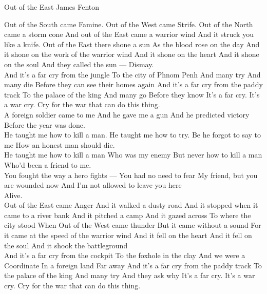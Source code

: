  \begin{poem}
{Out of the East}
{James Fenton}

 Out of the South came Famine.
 Out of the West came Strife.
 Out of the North came a storm cone
 And out of the East came a warrior wind
 And it struck you like a knife.
 Out of the East there shone a sun
 As the blood rose on the day
 And it shone on the work of the warrior wind
 And it shone on the heart
 And it shone on the soul
 And they called the sun --- Dismay.\\
 
 And it's a far cry from the jungle
 To the city of Phnom Penh
 And many try
 And many die
 Before they can see their homes again
 And it's a far cry from the paddy track
 To the palace of the king
 And many go
 Before they know
 It's a far cry.
 It's a war cry.
 Cry for the war that can do this thing.\\
 
 A foreign soldier came to me
 And he gave me a gun
 And he predicted victory
 Before the year was done.\\
 
 He taught me how to kill a man.
 He taught me how to try.
 Be he forgot to say to me
 How an honest man should die.\\
 
 He taught me how to kill a man
 Who was my enemy
 But never how to kill a man
 Who'd been a friend to me.\\
 
 You fought the way a hero fights ---
 You had no need to fear
 My friend, but you are wounded now
 And I'm not allowed to leave you here\\
 
 Alive.\\
 
 Out of the East came Anger
 And it walked a dusty road
 And it stopped when it came to a river bank
 And it pitched a camp
 And it gazed across
 To where the city stood
 When
 Out of the West came thunder
 But it came without a sound
 For it came at the speed of the warrior wind
 And it fell on the heart
 And it fell on the soul
 And it shook the battleground\\
 
 And it's a far cry from the cockpit
 To the foxhole in the clay
 And we were a
 Coordinate
 In a foreign land
 Far away
 And it's a far cry from the paddy track
 To the palace of the king
 And many try
 And they ask why
 It's a far cry.
 It's a war cry.
 Cry for the war that can do this thing.\\
 

\end{poem}
